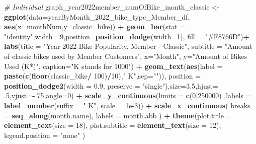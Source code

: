\documentclass[
]{article}
\newenvironment{Shaded}{\begin{snugshade}}{\end{snugshade}}
\newcommand{\AttributeTok}[1]{\textcolor[rgb]{0.13,0.29,0.53}{#1}}
\newcommand{\CommentTok}[1]{\textcolor[rgb]{0.56,0.35,0.01}{\textit{#1}}}
\newcommand{\DecValTok}[1]{\textcolor[rgb]{0.00,0.00,0.81}{#1}}
\newcommand{\FloatTok}[1]{\textcolor[rgb]{0.00,0.00,0.81}{#1}}
\newcommand{\FunctionTok}[1]{\textcolor[rgb]{0.13,0.29,0.53}{\textbf{#1}}}
\newcommand{\NormalTok}[1]{#1}
\newcommand{\OtherTok}[1]{\textcolor[rgb]{0.56,0.35,0.01}{#1}}
\newcommand{\SpecialCharTok}[1]{\textcolor[rgb]{0.81,0.36,0.00}{\textbf{#1}}}
\newcommand{\StringTok}[1]{\textcolor[rgb]{0.31,0.60,0.02}{#1}}
\begin{document}
\begin{Shaded}
\begin{Highlighting}[]
\CommentTok{\# Individual}
\NormalTok{graph\_year2022member\_numOfBike\_month\_classic }\OtherTok{\textless{}{-}} \FunctionTok{ggplot}\NormalTok{(}\AttributeTok{data=}\NormalTok{yearByMonth\_2022\_bike\_type\_Member\_df, }\FunctionTok{aes}\NormalTok{(}\AttributeTok{x=}\NormalTok{monthNum,}\AttributeTok{y=}\NormalTok{classic\_bike)) }\SpecialCharTok{+}
  \FunctionTok{geom\_bar}\NormalTok{(}\AttributeTok{stat =} \StringTok{"identity"}\NormalTok{,}\AttributeTok{width=}\NormalTok{.}\DecValTok{9}\NormalTok{,}\AttributeTok{position=}\FunctionTok{position\_dodge}\NormalTok{(}\AttributeTok{width=}\DecValTok{1}\NormalTok{), }\AttributeTok{fill =} \StringTok{"\#F8766D"}\NormalTok{)}\SpecialCharTok{+}
  \FunctionTok{labs}\NormalTok{(}\AttributeTok{title =} \StringTok{"Year 2022 Bike Popularity, Member {-} Classic"}\NormalTok{,}
       \AttributeTok{subtitle =} \StringTok{"Amount of classic bikes used by Member Customers"}\NormalTok{,}
       \AttributeTok{x=}\StringTok{"Month"}\NormalTok{,}
       \AttributeTok{y=}\StringTok{"Amount of Bikes Used (K*)"}\NormalTok{,}
       \AttributeTok{caption=}\StringTok{"K stands for 1000"}\NormalTok{) }\SpecialCharTok{+}
  \FunctionTok{geom\_text}\NormalTok{(}\FunctionTok{aes}\NormalTok{(}\AttributeTok{label =} \FunctionTok{paste}\NormalTok{(}\FunctionTok{c}\NormalTok{(}\FunctionTok{floor}\NormalTok{(classic\_bike}\SpecialCharTok{/} \DecValTok{100}\NormalTok{)}\SpecialCharTok{/}\DecValTok{10}\NormalTok{),}\StringTok{" K"}\NormalTok{,}\AttributeTok{sep=}\StringTok{""}\NormalTok{)),}
            \AttributeTok{position =} \FunctionTok{position\_dodge2}\NormalTok{(}\AttributeTok{width =} \FloatTok{0.9}\NormalTok{, }\AttributeTok{preserve =} \StringTok{"single"}\NormalTok{),}\AttributeTok{size=}\FloatTok{3.5}\NormalTok{,}\AttributeTok{hjust=}\NormalTok{ .}\DecValTok{5}\NormalTok{,}\AttributeTok{vjust=}\SpecialCharTok{{-}}\NormalTok{.}\DecValTok{75}\NormalTok{,}\AttributeTok{angle=}\DecValTok{0}\NormalTok{) }\SpecialCharTok{+}
  \FunctionTok{scale\_y\_continuous}\NormalTok{(}\AttributeTok{limits =} \FunctionTok{c}\NormalTok{(}\DecValTok{0}\NormalTok{,}\DecValTok{250000}\NormalTok{) ,}\AttributeTok{labels =} \FunctionTok{label\_number}\NormalTok{(}\AttributeTok{suffix =} \StringTok{" K"}\NormalTok{, }\AttributeTok{scale =} \FloatTok{1e{-}3}\NormalTok{)) }\SpecialCharTok{+}
  \FunctionTok{scale\_x\_continuous}\NormalTok{(}
    \AttributeTok{breaks =} \FunctionTok{seq\_along}\NormalTok{(month.name), }
    \AttributeTok{labels =}\NormalTok{ month.abb}
\NormalTok{  ) }\SpecialCharTok{+}
  \FunctionTok{theme}\NormalTok{(}\AttributeTok{plot.title =} \FunctionTok{element\_text}\NormalTok{(}\AttributeTok{size =} \DecValTok{18}\NormalTok{),}
        \AttributeTok{plot.subtitle =} \FunctionTok{element\_text}\NormalTok{(}\AttributeTok{size =} \DecValTok{12}\NormalTok{),}
        \AttributeTok{legend.position =} \StringTok{"none"}
\NormalTok{  ) }


\end{Highlighting}
\end{Shaded}
\end{document}
